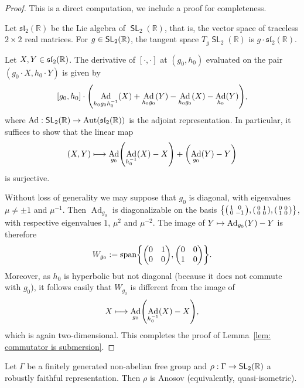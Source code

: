 \documentclass[AHL,Unicode,longabstracts]{cedram}
\DeclareMathOperator{\SL}{\mathsf{SL}}
\DeclareMathOperator{\spann}{span}
\DeclareMathOperator{\Ad}{Ad}
\DeclareMathOperator{\Aut}{Aut}
\newcommand{\R}{\mathbb{R}}
\newcommand{\RR}{\R}
\newcommand{\liesl}{\mathfrak{sl}_2(\RR)}
\renewcommand*{\to}{\mathchoice{\longrightarrow}{\rightarrow}{\rightarrow}{\rightarrow}}
\let\originalleft\left
\let\originalright\right
\renewcommand{\left}{\mathopen{}\mathclose\bgroup\originalleft}
\renewcommand{\right}{\aftergroup\egroup\originalright}
\let\oldmapsto\mapsto
\renewcommand*{\mapsto}{\mathchoice{\longmapsto}{\oldmapsto}{\oldmapsto}{\oldmapsto}}
\let\oldin\in
\renewcommand{\in}{\mathchoice{\oldin}{\oldin}{\,\oldin\,}{\,\oldin\,}}
\newcommand{\RR}{\mathbb{R}}
\begin{document}
\begin{proof}
This is a direct computation, we include a proof for completeness.


Let $\liesl$ be the Lie algebra of $\SL_2(\R)$, that is, the vector space of traceless $2\times 2$ real matrices. For $g\in\SL_2(\R)$, the tangent space $T_g\SL_2(\R)$ is $g\cdot\liesl$.

Let $X,Y\in\liesl$.
The derivative of $[\cdot,\cdot]$ at $(g_0,h_0)$ evaluated on the pair $(g_0\cdot X,h_0\cdot Y)$ is given by
\[
[g_0,h_0]\cdot \left(\Ad_{h_0g_0h_0^{-1}}(X)+\Ad_{h_0g_0}(Y)-\Ad_{h_0g_0}(X)-\Ad_{h_0}(Y)\right),
\]
where $\Ad:\SL_2(\R)\to\Aut(\liesl)$ is the adjoint representation.
In particular, it suffices to show that the linear map
\[
(X,Y)\mapsto \Ad_{g_0}\left(\Ad_{h_0^{-1}}(X)-X\right)+\left(\Ad_{g_0}(Y)-Y\right)
\]
is surjective.

Without loss of generality we may suppose that $g_0$ is diagonal, with eigenvalues $\mu\neq \pm 1$ and $\mu^{-1}$. Then $\Ad_{g_0}$ is diagonalizable on the basis $\left\{\left(
\begin{smallmatrix}
1 & 0 \\
0 & -1
\end{smallmatrix}\right),\left(
\begin{smallmatrix}
0 & 1 \\
0 & 0
\end{smallmatrix}\right),\left(
\begin{smallmatrix}
0 & 0 \\
1 & 0
\end{smallmatrix}\right)\right\}$, with respective eigenvalues $1$, $\mu^2$ and $\mu^{-2}$.
The image of $Y\mapsto \Ad_{g_0}(Y)-Y$ is therefore
\[
W_{g_0}:=\spann\left\{\left(
\begin{matrix}
0 & 1 \\
0 & 0
\end{matrix}\right),\left(
\begin{matrix}
0 & 0 \\
1 & 0
\end{matrix}\right)\right\}.
\]
Moreover, as $h_0$ is hyperbolic but not diagonal (because it does not commute with $g_0$), it follows easily that $W_{g_0}$ is different from the image of
\[
X\mapsto \Ad_{g_0}\left(\Ad_{h_0^{-1}}(X)-X\right),
\]
which is again two-dimensional.
This completes the proof of Lemma~\ref{lem: commutator is submersion}.
\end{proof}

\begin{prop}\label{prop:robustfaithfulSL2}
Let $\Gamma$ be a finitely generated non-abelian free group and $\rho: \Gamma \to \SL_2(\R)$ a robustly faithful representation. Then $\rho$ is Anosov (equivalently, quasi-isometric).
\end{prop}
\end{document}
